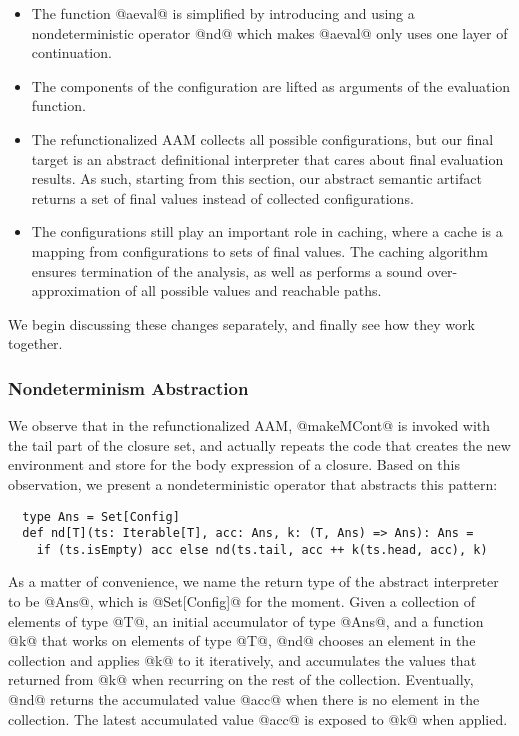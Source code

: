 \documentclass[acmsmall, screen]{acmart}\settopmatter{}
\begin{document}
\begin{itemize}
  \item The function @aeval@ is simplified by introducing and using a nondeterministic
    operator @nd@ which makes @aeval@ only uses one layer of continuation.
  \item The components of the configuration are lifted as arguments of the evaluation
    function.
  \item The refunctionalized AAM collects all possible configurations, but our final target is an
    abstract definitional interpreter that cares about final evaluation results.
    As such, starting from this section, our abstract semantic artifact returns a set of final
    values instead of collected configurations.
  \item The configurations still play an important role in caching, where a cache
    is a mapping from configurations to sets of final values. The caching algorithm
    ensures termination of the analysis, as well as performs a sound over-approximation
    of all possible values and reachable paths.
\end{itemize}

We begin discussing these changes separately, and finally see how they work together.

\subsubsection{Nondeterminism Abstraction}

We observe that in the refunctionalized AAM, @makeMCont@ is invoked with the tail part of
the closure set, and actually repeats the code that creates the new environment and
store for the body expression of a closure.
Based on this observation, we present a nondeterministic operator that abstracts this pattern:

\begin{lstlisting}
  type Ans = Set[Config]
  def nd[T](ts: Iterable[T], acc: Ans, k: (T, Ans) => Ans): Ans =
    if (ts.isEmpty) acc else nd(ts.tail, acc ++ k(ts.head, acc), k)
\end{lstlisting}

As a matter of convenience, we name the return type of the abstract interpreter to be @Ans@,
which is @Set[Config]@ for the moment.
Given a collection of elements of type @T@, an initial accumulator of type @Ans@, and a function
@k@ that works on elements of type @T@, @nd@ chooses an element in the collection and applies @k@
to it iteratively, and accumulates the values that returned from @k@ when recurring on the rest 
of the collection. Eventually, @nd@ returns the accumulated value @acc@ when there is no element
in the collection. The latest accumulated value @acc@ is exposed to @k@ when applied.
\end{document}
